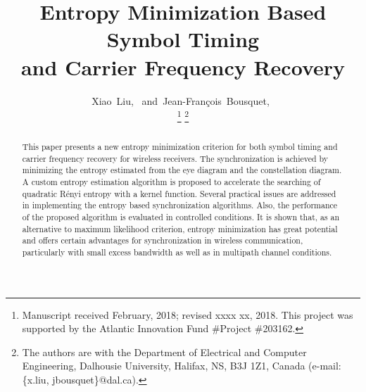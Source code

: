 \documentclass[12pt, draftclsnofoot, onecolumn]{IEEEtran}
\begin{document}
%

\title{Entropy Minimization Based Symbol Timing
\\and Carrier Frequency Recovery}
\author{Xiao~Liu,~
        and~Jean-Fran\c{c}ois~Bousquet,~%

\thanks{Manuscript received February, 2018; revised xxxx xx, 2018. This project was supported by the Atlantic Innovation Fund \#Project \#203162.}
\thanks{The authors are with the Department of Electrical and Computer Engineering, Dalhousie University, Halifax,
NS, B3J 1Z1, Canada (e-mail: \{x.liu, jbousquet\}@dal.ca).}%
}


\maketitle


\begin{abstract}
This paper presents a new entropy minimization criterion for both symbol timing and carrier frequency recovery for  wireless receivers.
The synchronization is achieved by minimizing the entropy estimated from the eye diagram and the constellation diagram. 
A custom entropy estimation algorithm is proposed to accelerate the searching of quadratic R\'enyi entropy with a kernel function.
Several practical issues are addressed in implementing the entropy based synchronization algorithms.
Also, the performance of the proposed algorithm is evaluated in controlled conditions.
It is shown that, as an alternative to maximum likelihood criterion, entropy minimization has great potential and offers certain advantages for synchronization in wireless communication, particularly with small excess bandwidth as well as  in multipath channel conditions.

\end{abstract}
\end{document}
